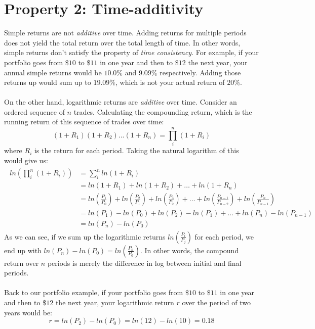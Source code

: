 \documentclass[11pt, oneside]{article}   	%
\begin{document}
\section{Property 2:  Time-additivity}
Simple returns are not \emph{additive} over time. Adding returns for multiple periods does not yield the total return over the total length of time. In other words, simple returns don't satisfy the property of \emph{time consistency}. For example, if your portfolio goes from $\$10$ to $\$11$ in one year and then to $\$12$ the next year, your annual simple returns would be $10.0\%$ and $9.09\%$ respectively. Adding those returns up would sum up to $19.09\%$, which is not your actual return of $20\%$.
\\
\\
On the other hand, logarithmic returns are \emph{additive} over time. Consider an ordered sequence of $n$ trades. Calculating the compounding return, which is the running return of this sequence of trades over time:
\begin{equation}
	(1+R_1)(1+R_2)...(1+R_n) = \displaystyle{\prod_{i}^{n}} (1 + R_i)
\end{equation}
where $R_i$ is the return for each period. Taking the natural logarithm of this would give us:
\begin{align*}
	\begin{split}
	ln(\displaystyle{\prod_{i}^{n}} (1 + R_i)) 
	& = \displaystyle{\sum_{i}^{n}} ln(1 + R_i) \\ 
	& = ln(1 + R_1) + ln(1 + R_2) + \dots + ln(1 + R_n) \\
	& = ln(\frac{P_1}{P_0}) + ln(\frac{P_2}{P_1}) + ln(\frac{P_3}{P_2}) + \dots + ln(\frac{P_{n-1}}{P_{n-2}}) + ln(\frac{P_n}{P_{n-1}}) \\
	& = ln(P_1) - ln(P_0) + ln(P_2) - ln(P_1) + \dots + ln(P_n) - ln(P_{n-1}) \\
	& = ln(P_n) - ln(P_0)
	\end{split}
\end{align*}
As we can see, if we sum up the logarithmic returns $ln(\frac{P_i}{P_j})$ for each period, we end up with $ln(P_n) - ln(P_0) = ln(\frac{P_n}{P_0})$. In other words, the compound return over $n$ periods is merely the difference in log between initial and final periods. 
\\
\\
Back to our portfolio example, if your portfolio goes from $\$10$ to $\$11$ in one year and then to $\$12$ the next year, your logarithmic return $r$ over the period of two years would be:
\begin{equation}
	r = ln(P_2) - ln(P_0) = ln(12) - ln(10) = 0.18
\end{equation}
\end{document}
